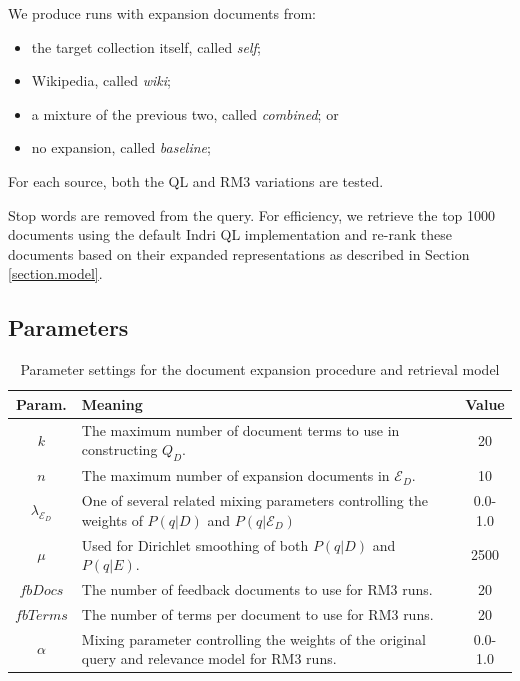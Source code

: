 \documentclass{sig-alternate}
\begin{document}
We produce runs with expansion documents from:
\begin{itemize}
	\item the target collection itself, called \textit{self};
	\item Wikipedia, called \textit{wiki};
	\item a mixture of the previous two, called \textit{combined}; or
	\item no expansion, called \textit{baseline};
\end{itemize}

\noindent For each source, both the QL and RM3 variations are tested.

Stop words are removed from the query. For efficiency, we retrieve the top 1000 documents using the default Indri QL implementation and re-rank these documents based on their expanded representations as described in Section \ref{section.model}.

\subsection{Parameters}\label{section.evaluation.parameters}

\begin{table}[htb]
\centering
\begin{tabular}{|c|p{}|c|} \hline
{\bf Param.} & {\bf Meaning} & {\bf Value} \\ \hline
$k$ & The maximum number of document terms to use in constructing $Q_D$. & 20 \\ \hline
$n$ & The maximum number of expansion documents in $\mathcal{E}_D$. & 10 \\ \hline
$\lambda_{\mathcal{E}_D}$ & One of several related mixing parameters controlling the weights of $P(q|D)$ and $P(q|\mathcal{E}_D)$ & 0.0-1.0 \\ \hline
$\mu$ & Used for Dirichlet smoothing of both $P(q|D)$ and $P(q|E)$. & 2500 \\ \hline
$fbDocs$ & The number of feedback documents to use for RM3 runs. & 20 \\ \hline
$fbTerms$ & The number of terms per document to use for RM3 runs. & 20 \\ \hline
$\alpha$ & Mixing parameter controlling the weights of the original query and relevance model for RM3 runs. & 0.0-1.0 \\ \hline
\end{tabular}
\caption{Parameter settings for the document expansion procedure and retrieval model}
\label{table.parameters}
\end{table}
\end{document}
